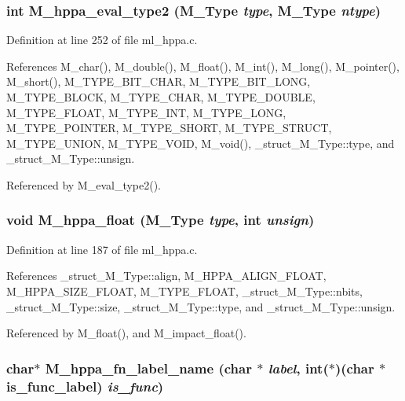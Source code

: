 \subsubsection{\setlength{\rightskip}{0pt plus 5cm}int M\_\-hppa\_\-eval\_\-type2 (\bf{M\_\-Type} {\em type}, \bf{M\_\-Type} {\em ntype})}\label{m__hppa_8h_9f1775696fc5518a268eb6fd815cb6fe}




Definition at line 252 of file ml\_\-hppa.c.

References M\_\-char(), M\_\-double(), M\_\-float(), M\_\-int(), M\_\-long(), M\_\-pointer(), M\_\-short(), M\_\-TYPE\_\-BIT\_\-CHAR, M\_\-TYPE\_\-BIT\_\-LONG, M\_\-TYPE\_\-BLOCK, M\_\-TYPE\_\-CHAR, M\_\-TYPE\_\-DOUBLE, M\_\-TYPE\_\-FLOAT, M\_\-TYPE\_\-INT, M\_\-TYPE\_\-LONG, M\_\-TYPE\_\-POINTER, M\_\-TYPE\_\-SHORT, M\_\-TYPE\_\-STRUCT, M\_\-TYPE\_\-UNION, M\_\-TYPE\_\-VOID, M\_\-void(), \_\-struct\_\-M\_\-Type::type, and \_\-struct\_\-M\_\-Type::unsign.

Referenced by M\_\-eval\_\-type2().
\subsubsection{\setlength{\rightskip}{0pt plus 5cm}void M\_\-hppa\_\-float (\bf{M\_\-Type} {\em type}, int {\em unsign})}\label{m__hppa_8h_a602a3496ec13df4220bd2a7fc6a8167}




Definition at line 187 of file ml\_\-hppa.c.

References \_\-struct\_\-M\_\-Type::align, M\_\-HPPA\_\-ALIGN\_\-FLOAT, M\_\-HPPA\_\-SIZE\_\-FLOAT, M\_\-TYPE\_\-FLOAT, \_\-struct\_\-M\_\-Type::nbits, \_\-struct\_\-M\_\-Type::size, \_\-struct\_\-M\_\-Type::type, and \_\-struct\_\-M\_\-Type::unsign.

Referenced by M\_\-float(), and M\_\-impact\_\-float().
\subsubsection{\setlength{\rightskip}{0pt plus 5cm}char$\ast$ M\_\-hppa\_\-fn\_\-label\_\-name (char $\ast$ {\em label}, int($\ast$)(char $\ast$is\_\-func\_\-label) {\em is\_\-func})}\label{m__hppa_8h_9220a2944c316bd79328621e28405ea4}




